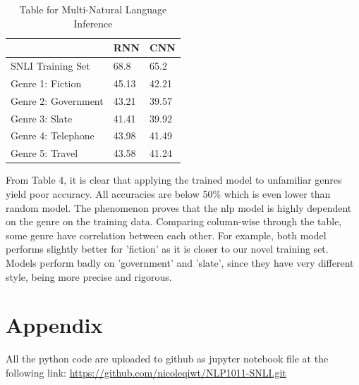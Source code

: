 \documentclass[10pt]{article}
\begin{document}
\begin{table}[h]
\centering
\caption{Table for Multi-Natural Language Inference}
\label{my-label}
\begin{tabular}{lll}
\hline
 & RNN & CNN \\ \hline
SNLI Training Set & 68.8 & 65.2 \\
Genre 1: Fiction & 45.13 & 42.21 \\
Genre 2: Government & 43.21 & 39.57 \\
Genre 3: Slate & 41.41 & 39.92 \\
Genre 4: Telephone & 43.98 & 41.49 \\
Genre 5: Travel & 43.58 & 41.24 \\ \hline
\end{tabular}
\end{table}

From Table 4, it is clear that applying the trained model to unfamiliar genres yield poor accuracy. All accuracies are below 50\% which is even lower than random model. The phenomenon proves that the nlp model is highly dependent on the genre on the training data. Comparing column-wise through the table, some genre have correlation between each other. For example, both model performs slightly better for 'fiction' as it is closer to our novel training set. Models perform badly on 'government' and 'slate', since they have very different style, being more precise and rigorous.



\section{Appendix}
All the python code are uploaded to github as jupyter notebook file at the following link:
\url{https://github.com/nicoleqiwt/NLP1011-SNLI.git}
\end{document}
